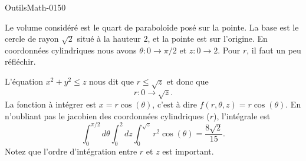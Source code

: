 
\begin{corrige}{OutilsMath-0150}

    Le volume considéré est le quart de paraboloïde posé sur la pointe. La base est le cercle de rayon \( \sqrt{2}\) situé à la hauteur \( 2\), et la pointe est sur l'origine. En coordonnées cylindriques nous avons \( \theta\colon 0\to \pi/2\) et \( z\colon 0\to 2\). Pour \( r\), il faut un peu réfléchir.
    
    L'équation \( x^2+y^2\leq z\) nous dit que \( r\leq \sqrt{z}\) et donc que
    \begin{equation}
        r\colon 0\to \sqrt{z}.
    \end{equation}
    La fonction à intégrer est \( x=r\cos(\theta)\), c'est à dire \( f(r,\theta,z)=r\cos(\theta)\). En n'oubliant pas le jacobien des coordonnées cylindriques (\( r\)), l'intégrale est
    \begin{equation}
        \int_0^{\pi/2}d\theta\int_0^2dz\int_0^{\sqrt{z}}r^2\cos(\theta)=\frac{ 8\sqrt{2} }{ 15 }.
    \end{equation}
    Notez que l'ordre d'intégration entre \( r\) et \( z\) est important.

\end{corrige}
